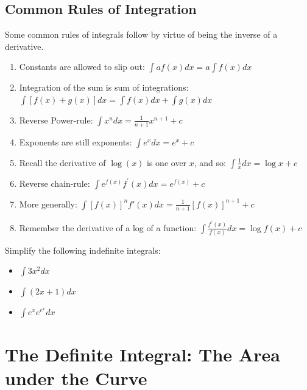 \documentclass[]{book}
\providecommand{\tightlist}{%
  \setlength{\itemsep}{0pt}\setlength{\parskip}{0pt}}
\theoremstyle{definition}
\theoremstyle{definition}
\theoremstyle{definition}
\theoremstyle{remark}
\let\BeginKnitrBlock\begin \let\EndKnitrBlock\end
\begin{document}
\subsection*{Common Rules of
Integration}\label{common-rules-of-integration}

Some common rules of integrals follow by virtue of being the inverse of
a derivative.

\begin{enumerate}
\def\labelenumi{\arabic{enumi}.}
\tightlist
\item
  Constants are allowed to slip out: \(\int a f(x)dx = a\int f(x)dx\)
\item
  Integration of the sum is sum of integrations:
  \(\int [f(x)+g(x)]dx=\int f(x)dx + \int g(x)dx\)
\item
  Reverse Power-rule: \(\int x^n dx = \frac{1}{n+1} x^{n+1} + c\)
\item
  Exponents are still exponents: \(\int e^x dx = e^x +c\)
\item
  Recall the derivative of \(\log(x)\) is one over \(x\), and so:
  \(\int \frac{1}{x} dx = \log x + c\)
\item
  Reverse chain-rule: \(\int e^{f(x)}f^\prime(x)dx = e^{f(x)}+c\)
\item
  More generally:
  \(\int [f(x)]^n f'(x)dx = \frac{1}{n+1}[f(x)]^{n+1}+c\)
\item
  Remember the derivative of a log of a function:
  \(\int \frac{f^\prime(x)}{f(x)}dx=\log f(x) + c\)
\end{enumerate}

\BeginKnitrBlock{example}[Common Integration]
\protect\hypertarget{exm:unnamed-chunk-25}{}{\label{exm:unnamed-chunk-25}
{} }Simplify the following indefinite
integrals:

\begin{itemize}
\tightlist
\item
  \(\int 3x^2 dx\)
\item
  \(\int (2x+1)dx\)
\item
  \(\int e^x e^{e^x} dx\)
\end{itemize}
\EndKnitrBlock{example}

\section{The Definite Integral: The Area under the
Curve}\label{the-definite-integral-the-area-under-the-curve}
\end{document}
